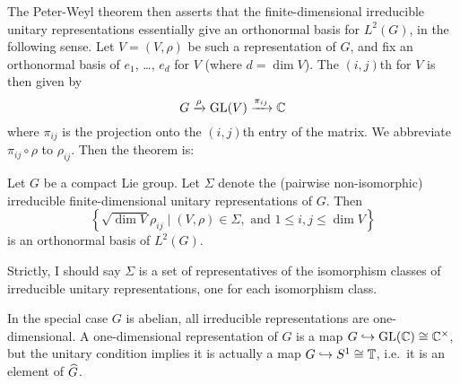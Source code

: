 The Peter-Weyl theorem then asserts that the finite-dimensional irreducible
unitary representations essentially give an orthonormal basis for $L^2(G)$,
in the following sense.  Let $V = (V, \rho)$ be such a representation of $G$,
and fix an orthonormal basis of $e_1$, \dots, $e_d$ for $V$ (where $d = \dim V$).
The $(i,j)$th  for $V$ is then given by 
\[ G \xrightarrow{\rho} \operatorname{GL}(V) \xrightarrow{\pi_{ij}} \mathbb C \]
where $\pi_{ij}$ is the projection onto the $(i,j)$th entry of the matrix.
We abbreviate $\pi_{ij} \circ \rho$ to $\rho_{ij}$.
Then the theorem is:
\begin{theorem}
	Let $G$ be a compact Lie group.
	Let $\Sigma$ denote the (pairwise non-isomorphic) irreducible finite-dimensional
	unitary representations of $G$.
	Then
	\[ \left\{ \sqrt{\dim V} \rho_{ij}
			\; \Big\vert \; (V, \rho) \in \Sigma,
			\text{ and } 1 \le i,j \le \dim V \right\}  \]
	is an orthonormal basis of $L^2(G)$.
\end{theorem}
Strictly, I should say $\Sigma$ is a set of representatives of 
the isomorphism classes of irreducible unitary representations,
one for each isomorphism class.

In the special case $G$ is abelian,
all irreducible representations are one-dimensional.
A one-dimensional representation of $G$ is a map
$G \hookrightarrow \operatorname{GL}(\mathbb C) \cong \mathbb C^\times$,
but the unitary condition implies it is actually a map $G \hookrightarrow S^1 \cong \mathbb T$,
i.e.\ it is an element of $\widehat G$.


